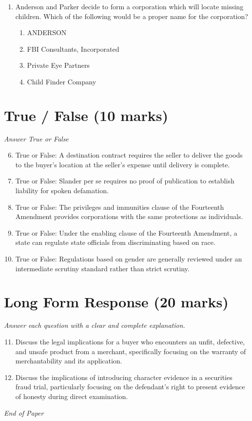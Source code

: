 \documentclass[12pt]{article}
\begin{document}
\begin{enumerate}[label=\arabic*.]
\begin{enumerate}[label=(\alph*)]
    \item Equal protection problem
    \item Procedural due process problem
    \item None of these
\end{enumerate}
\item Anderson and Parker decide to form a corporation which will locate missing children. Which of the following would be a proper name for the corporation?
\begin{enumerate}[label=(\alph*)]
    \item ANDERSON
    \item FBI Consultants, Incorporated
    \item Private Eye Partners
    \item Child Finder Company
\end{enumerate}
\end{enumerate}

\section*{True / False (10 marks)}
\textit{Answer True or False}
\begin{enumerate}[label=\arabic*.]
\setcounter{enumi}{5}
\item True or False: A destination contract requires the seller to deliver the goods to the buyer's location at the seller's expense until delivery is complete.
\item True or False: Slander per se requires no proof of publication to establish liability for spoken defamation.
\item True or False: The privileges and immunities clause of the Fourteenth Amendment provides corporations with the same protections as individuals.
\item True or False: Under the enabling clause of the Fourteenth Amendment, a state can regulate state officials from discriminating based on race.
\item True or False: Regulations based on gender are generally reviewed under an intermediate scrutiny standard rather than strict scrutiny.
\end{enumerate}

\section*{Long Form Response (20 marks)}
\textit{Answer each question with a clear and complete explanation.}
\begin{enumerate}[label=\arabic*.]
\setcounter{enumi}{10}
\item Discuss the legal implications for a buyer who encounters an unfit, defective, and unsafe product from a merchant, specifically focusing on the warranty of merchantability and its application.
\item Discuss the implications of introducing character evidence in a securities fraud trial, particularly focusing on the defendant's right to present evidence of honesty during direct examination.
\end{enumerate}

\vfill
\noindent\textit{End of Paper}
\end{document}

